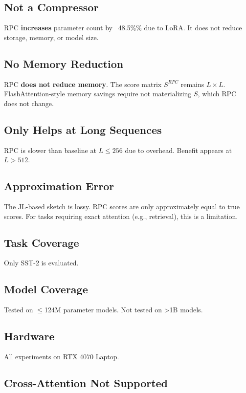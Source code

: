 \subsection{Not a Compressor}

RPC \textbf{increases} parameter count by ~48.5\%\% due to LoRA. It 
does not reduce storage, memory, or model size.

\subsection{No Memory Reduction}

RPC \textbf{does not reduce memory}. The score matrix $S^{RPC}$ remains $L \times L$. 
FlashAttention-style memory savings require not materializing $S$, which 
RPC does not change.

\subsection{Only Helps at Long Sequences}

RPC is slower than baseline at $L \leq 256$ due to overhead. Benefit appears 
at $L > 512$.

\subsection{Approximation Error}

The JL-based sketch is lossy. RPC scores are only approximately equal to 
true scores. For tasks requiring exact attention (e.g., retrieval), this 
is a limitation.

\subsection{Task Coverage}

Only SST-2 is evaluated.

\subsection{Model Coverage}

Tested on $\le$124M parameter models. Not tested on >1B models.

\subsection{Hardware}

All experiments on RTX 4070 Laptop.

\subsection{Cross-Attention Not Supported}

